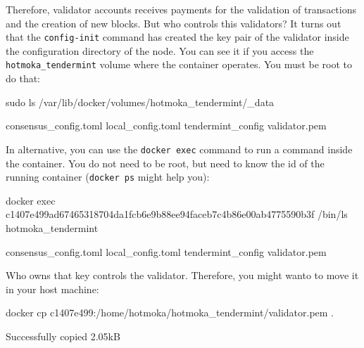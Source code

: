 Therefore, validator accounts receives payments for the validation of transactions
and the creation of new blocks.
But who controls this validators? It turns out that the \texttt{config-init} command
has created the key pair of the validator inside the configuration directory of the node.
You can see it if you access the \texttt{hotmoka\_tendermint} volume where the container operates.
You must be root to do that:
%
\begin{shellcommandbox}\begin{ttlst}
sudo ls /var/lib/docker/volumes/hotmoka_tendermint/_data
\end{ttlst}\end{shellcommandbox}
%
\begin{shellbox}\begin{ttlst}
consensus_config.toml  local_config.toml  tendermint_config  validator.pem
\end{ttlst}\end{shellbox}
%
In alternative, you can use the \texttt{docker exec} command to run a command inside the container.
You do not need to be root, but need to know the id of the running container (\texttt{docker ps} might help you):
%
\begin{shellcommandbox}\begin{ttlst}
docker exec c1407e499ad67465318704da1fcb6e9b88ee94faceb7c4b86e00ab4775590b3f /bin/ls hotmoka_tendermint
\end{ttlst}\end{shellcommandbox}
%
\begin{shellbox}\begin{ttlst}
consensus_config.toml
local_config.toml
tendermint_config
validator.pem
\end{ttlst}\end{shellbox}
%
Who owns that key controls the validator. Therefore, you might wanto to move it in your host machine:
%
\begin{shellcommandbox}\begin{ttlst}
docker cp c1407e499:/home/hotmoka/hotmoka_tendermint/validator.pem .
\end{ttlst}\end{shellcommandbox}
%
\begin{shellbox}\begin{ttlst}
Successfully copied 2.05kB
\end{ttlst}\end{shellbox}

